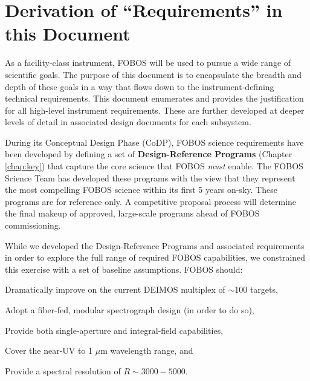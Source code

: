 \documentclass[11pt,a4paper,twoside,onecolumn,openany,final,oldfontcommands]{memoir}
\begin{document}
\section{Derivation of ``Requirements'' in this Document}

As a facility-class instrument, FOBOS will be used to pursue a wide range of scientific goals.  The purpose of this document is to encapsulate the breadth and depth of these goals in a way that flows down to the instrument-defining technical requirements.  This document enumerates and provides the justification for all high-level instrument requirements.  These are further developed at deeper levels of detail in associated design documents for each subsystem.

During its Conceptual Design Phase (CoDP), FOBOS science requirements have been developed by defining a set of \textbf{Design-Reference Programs} (Chapter \ref{chap:key}) that capture the core science that FOBOS \textit{must} enable.  The FOBOS Science Team has developed these programs with the view that they represent the most compelling FOBOS science within its first 5 years on-sky.  These programs are for reference only.  A competitive proposal process will determine the final makeup of approved, large-scale programs ahead of FOBOS commissioning. 


While we developed the Design-Reference Programs and associated requirements in order to explore the full range of required FOBOS capabilities, we constrained this exercise with a set of baseline assumptions.  FOBOS should:

\medskip
\begin{asparaenum}
\item Dramatically improve on the current DEIMOS multiplex of $\sim$100 targets,
\item Adopt a fiber-fed, modular spectrograph design (in order to do so),
\item Provide both single-aperture and integral-field capabilities,
\item Cover the near-UV to 1 $\mu$m wavelength range, and
\item Provide a spectral resolution of $R\sim 3000-5000$.
\end{asparaenum}
\medskip
\end{document}
